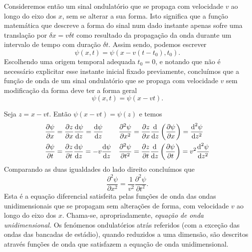 Consideremos então um sinal ondulatório que se propaga com velocidade $v$ ao
longo do eixo dos $x$, sem se alterar a sua forma. Isto significa que a função
matemática que descreve a forma do sinal num dado instante apenas sofre uma
translação por $\delta x=v\delta t$ como resultado da propagação da onda durante
um intervalo de tempo com duração $\delta t$. Assim sendo, podemos escrever
\begin{equation*}
    \psi(x,t) = \psi(x-v(t-t_0),t_0).
\end{equation*}
Escolhendo uma origem temporal adequada $t_0=0$, e notando que não é necessário
explicitar esse instante inicial fixado previamente, concluímos que a função de
onda de um sinal ondulatório que se propaga com velocidade $v$ sem modificação
da forma deve ter a forma geral
\begin{equation*}
    \psi(x,t)=\psi(x-vt).
\end{equation*}

Seja $z=x-vt$. Então $\psi(x-vt)=\psi(z)$ e temos
\begin{align*}
    \frac{\partial \psi}{\partial x}&=\frac{\partial z}{\partial x}\frac{\text{d} \psi}{\text{d} z}=\frac{\text{d} \psi}{\text{d} z}&
    \frac{\partial^2\psi}{\partial x^2}&=\frac{\partial z}{\partial x}\frac{\text{d} }{\text{d} z}\left(\frac{\partial \psi}{\partial x}
        \right)=\frac{\text{d}^2\psi}{\text{d}z^2}\\
    \frac{\partial \psi}{\partial t}&=\frac{\partial z}{\partial t}\frac{\text{d} \psi}{\text{d} z}=-v\frac{\text{d} \psi}{\text{d} z}&
    \frac{\partial^2\psi}{\partial t^2}&=\frac{\partial z}{\partial t}\frac{\text{d} }{\text{d} z}\left(\frac{\partial \psi}{\partial t}
        \right)=v^2\frac{\text{d}^2\psi}{\text{d}z^2}
\end{align*}
Comparando as duas igualdades do lado direito concluímos que
\begin{equation}\label{eq:waveq}
    \frac{\partial^2\psi}{\partial x^2} =
        \frac{1}{v^2} \frac{\partial^2\psi}{\partial t^2}.
\end{equation}
Esta é a equação diferencial satisfeita pelas funções de onda das ondas
unidimensionais que se propagam sem alterações de forma, com velocidade $v$ ao
longo do eixo dos $x$. Chama-se, apropriadamente, \emph{equação de onda
unidimensional.}
Os fenómenos ondulatórios atrás referidos (com a exceção das ondas das bancadas
de estádio), quando reduzidos a uma dimensão, são descritos através funções de
onda que satisfazem a equação de onda unidimensional.



